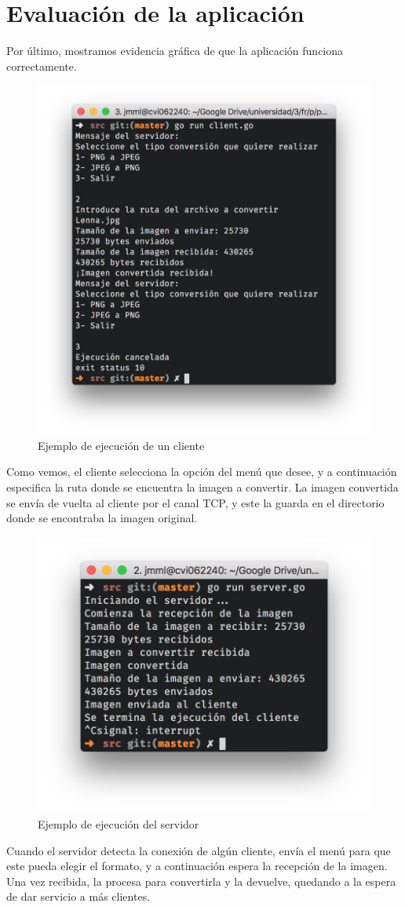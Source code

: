 \documentclass[11pt]{article}
\begin{document}
\section{Evaluación de la aplicación}

Por último, mostramos evidencia gráfica de que la aplicación funciona correctamente.

\begin{figure}[h]
	\centering
	\includegraphics[width=.5\textwidth]{img/cliente}
	\caption{Ejemplo de ejecución de un cliente}
\end{figure}

Como vemos, el cliente selecciona la opción del menú que desee, y a continuación especifica la ruta donde se encuentra la imagen a convertir. La imagen convertida se envía de vuelta al cliente por el canal TCP, y este la guarda en el directorio donde se encontraba la imagen original.

\begin{figure}[ht!]
	\centering
	\includegraphics[width=.5\textwidth]{img/servidor}
	\caption{Ejemplo de ejecución del servidor}
\end{figure}

Cuando el servidor detecta la conexión de algún cliente, envía el menú para que este pueda elegir el formato, y a continuación espera la recepción de la imagen. Una vez recibida, la procesa para convertirla y la devuelve, quedando a la espera de dar servicio a más clientes.
	
\end{document}

